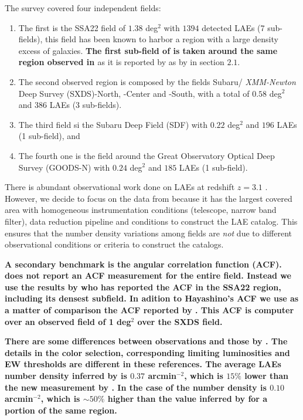 \documentclass[usenatbib]{mn2e}
\begin{document}
The survey covered four independent fields:

\begin{enumerate}
\item The first is the SSA22
field of $1.38$ deg$^2$ with $1394$ detected LAEs (7 sub-fields), this
field has been known to harbor a region with a large density excess of
galaxies. {\bf The first sub-field of is taken around the same region
  observed in \cite{Hayashino2004} } as it is reported  by as by
\cite{Yamada2012} in section $2.1$. 

\item The second observed region is composed by the fields Subaru/{\it
  XMM-Newton} Deep Survey (SXDS)-North, -Center and -South, with a
total of $0.58$ deg$^2$ and $386$ LAEs (3 sub-fields).

\item The third  field si the Subaru Deep Field (SDF) with $0.22$ deg$^2$ and
$196$ LAEs (1 sub-field), and 

\item The fourth one is the field around the Great Observatory
Optical Deep Survey  (GOODS-N) with $0.24$ deg$^2$ and $185$ LAEs (1
sub-field).  
\end{enumerate}
   

There is abundant observational work done on LAEs at redshift $z=3.1$
\citep{Kudritzki2000,Matsuda2005,Gawiser2007,Nilsson2007,Ouchi2008}.
However, we decide to focus on the data from \cite{Yamada2012} because
it has the largest covered area with homogeneous instrumentation
conditions (telescope, narrow band filter), data reduction pipeline
and conditions to construct the LAE catalog. This ensures that the
number density variations among fields are \emph{not} due to different
observational conditions or criteria to construct the catalogs.

{\bf A secondary benchmark is the angular correlation function
(ACF). \cite{Yamada2012} does not report an ACF measurement for
  the entire field. Instead we use the results by
  \cite{Hayashino2004} who has reported the ACF in the SSA22 region,
  including its densest subfield. In adition to Hayashino's ACF we use
  as a matter of comparison the ACF reported by
  \cite{Ouchi2008}. This ACF is computer over an observed field of 1
  deg$^2$ over the SXDS field.} 


{\bf There are some differences between \cite{Ouchi2008} observations
  and those by \cite{Yamada2012}. The details in the color selection,
  corresponding limiting luminosities and EW thresholds are different
  in these references. The average LAEs number density inferred by
  \cite{Hayashino2004} is   $0.37$ arcmin$^{-2}$, which is $15\%$
  lower than the new measurement by \cite{Yamada2012}. In the case of
  \cite{Ouchi2008} the number density is $0.10$ arcmin$^{-2}$, which
  is $\sim 50\%$ higher than the value inferred by \cite{Yamada2012}
  for a portion of the same region.} 
\end{document}
